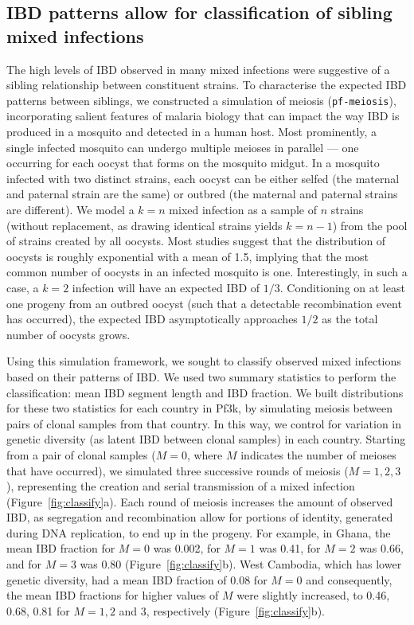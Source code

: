 \documentclass[9pt,lineno]{elife}
\begin{document}
\subsection{IBD patterns allow for classification of sibling mixed infections}


The high levels of IBD observed in many mixed infections were suggestive of a sibling relationship between constituent strains. To characterise the expected IBD patterns between siblings, we constructed a simulation of meiosis ({\tt pf-meiosis}), incorporating salient features of malaria biology that can impact the way IBD is produced in a mosquito and detected in a human host. Most prominently, a single infected mosquito can undergo multiple meioses in parallel --- one occurring for each oocyst that forms on the mosquito midgut.  In a mosquito infected with two distinct strains, each oocyst can be either selfed (the maternal and paternal strain are the same) or outbred (the maternal and paternal strains are different). We model a $k=n$ mixed infection as a sample of $n$ strains (without replacement, as drawing identical strains yields $k=n-1$) from the pool of strains created by all oocysts. Most studies suggest that the distribution of oocysts is roughly exponential with a mean of 1.5, implying that the most common number of oocysts in an infected mosquito is one. Interestingly, in such a case, a $k=2$ infection will have an expected IBD of $1/3$. Conditioning on at least one progeny from an outbred oocyst (such that a detectable recombination event has occurred), the expected IBD asymptotically approaches $1/2$ as the total number of oocysts grows.

Using this simulation framework, we sought to classify observed mixed infections based on their patterns of IBD. We used two summary statistics to perform the classification: mean IBD segment length and IBD fraction. We built distributions for these two statistics for each country in Pf3k, by simulating meiosis between pairs of clonal samples from that country.  In this way, we control for variation in genetic diversity (as latent IBD between clonal samples) in each country. Starting from a pair of clonal samples ($M=0$, where $M$ indicates the number of meioses that have occurred), we simulated three successive rounds of meiosis ($M=1, 2, 3$), representing the creation and serial transmission of a mixed infection (Figure~\ref{fig:classify}a). Each round of meiosis increases the amount of observed IBD, as segregation and recombination allow for portions of identity, generated during DNA replication, to end up in the progeny. For example, in Ghana, the mean IBD fraction for $M=0$ was 0.002, for $M=1$ was 0.41, for $M=2$ was 0.66, and for $M=3$ was 0.80 (Figure~\ref{fig:classify}b). West Cambodia, which has lower genetic diversity, had a mean IBD fraction of 0.08 for $M=0$ and consequently, the mean IBD fractions for higher values of $M$ were slightly increased, to 0.46, 0.68, 0.81 for $M=1, 2$ and $3$, respectively (Figure~\ref{fig:classify}b).
\end{document}
